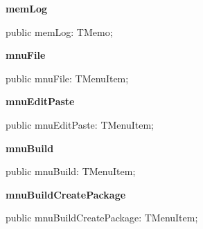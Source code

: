 \documentclass{report}
\newif\ifpdf
\begin{document}
\begin{list}{}
\begin{flushleft}
\ifpdf
\end{flushleft}
\fi


\par  \label{editor.TFrmEditor-memLog}
\item[\textbf{memLog}\hfill]
\ifpdf
\begin{flushleft}
\fi
\begin{ttfamily}
public memLog: TMemo;\end{ttfamily}

\ifpdf
\end{flushleft}
\fi


\par  \label{editor.TFrmEditor-mnuFile}
\item[\textbf{mnuFile}\hfill]
\ifpdf
\begin{flushleft}
\fi
\begin{ttfamily}
public mnuFile: TMenuItem;\end{ttfamily}

\ifpdf
\end{flushleft}
\fi


\par  \label{editor.TFrmEditor-mnuEditPaste}
\item[\textbf{mnuEditPaste}\hfill]
\ifpdf
\begin{flushleft}
\fi
\begin{ttfamily}
public mnuEditPaste: TMenuItem;\end{ttfamily}

\ifpdf
\end{flushleft}
\fi


\par  \label{editor.TFrmEditor-mnuBuild}
\item[\textbf{mnuBuild}\hfill]
\ifpdf
\begin{flushleft}
\fi
\begin{ttfamily}
public mnuBuild: TMenuItem;\end{ttfamily}

\ifpdf
\end{flushleft}
\fi


\par  \label{editor.TFrmEditor-mnuBuildCreatePackage}
\item[\textbf{mnuBuildCreatePackage}\hfill]
\ifpdf
\begin{flushleft}
\fi
\begin{ttfamily}
public mnuBuildCreatePackage: TMenuItem;\end{ttfamily}


\end{flushleft}
\end{list}
\end{document}
